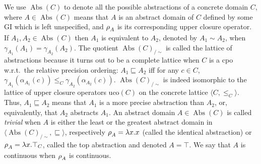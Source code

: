 \documentclass[runningheads]{llncs}
\def\ok#1{\mbox{\raisebox{0ex}[1ex][1ex]{$#1$}}}
\newcommand{\auco}[2]{\ok{\rho^{#1}_{#2}}}
\newcommand{\uco}{\ensuremath{\mathrm{uco}}}
\DeclareMathOperator{\Abs}{Abs}
\def\ok#1{\mbox{\raisebox{0ex}[1ex][1ex]{$#1$}}}
\def\cAA{\ensuremath{A}}
\def\tuple#1{\langle #1 \rangle}
\begin{document}
\smallskip

We use $\Abs(C)$ to denote all the possible abstractions of a concrete domain $C$, where
$A\in \Abs(C)$ means that $A$ is an abstract domain of $C$ defined by some GI which is left unspecified, 
and $\auco{}{\cAA}$ is its corresponding upper closure operator.
If $A_1,A_2\in \Abs(C)$ then $A_1$ is equivalent to $A_2$, denoted by $A_1\sim A_2$, when 
$\gamma_{A_1}(A_1) = \gamma_{A_2}(A_2)$. The quotient  $\Abs(C)_{/\sim}$ is
called the lattice of abstractions because it turns out to be a complete lattice when $C$ is a cpo \cite{ran99}
w.r.t.\ the relative precision ordering: 
$A_1 \sqsubseteq A_2$ iff for any $c\in C$, $\gamma_{A_1}(\alpha_{A_1}(c)) \leq_C  \gamma_{A_2}(\alpha_{A_2}(c))$. 
$\Abs(C)_{/\sim}$ is indeed isomorphic to the lattice of upper closure operators $\uco(C)$ on the concrete lattice $\tuple{C,\leq_C}$.
Thus, $A_1 \sqsubseteq A_2$ means that $A_1$ is a more precise abstraction than $A_2$, or, equivalently, that $A_2$ abstracts $A_1$.  
An abstract domain 
$A\in \Abs(C)$ is called {\em trivial\/} when 
$A$ is either the least or the greatest abstract domain in $\tuple{\Abs(C)_{/\sim},\sqsubseteq}$, respectively $\auco{}{\cAA} = \lambda x.x$ (called the identical abstraction) or $\auco{}{\cAA} =
\lambda x.\top_C$, called the top abstraction and denoted $\cAA=\top$. We say that $\cAA$ is continuous when $\auco{}{\cAA}$ is continuous.

\end{document}
